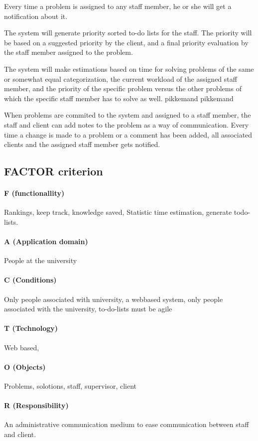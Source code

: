 Every time a problem is assigned to any staff member, he or she will get a notification about it.

The system will generate priority sorted to-do lists for the staff. The priority will be based on a suggested priority by the client, and a final priority evaluation by the staff member assigned to the problem.

The system will make estimations based on time for solving problems of the same or somewhat equal categorization, the current workload of the assigned staff member, and the priority of the specific problem versus the other problems of which the specific staff member has to solve as well. pikkemand pikkemand

When problems are commited to the system and assigned to a staff member, the staff and client can add notes to the problem as a way of communication. Every time a change is made to a problem or a comment has been added, all associated clients and the assigned staff member gets notified.

\subsection{FACTOR criterion}
\label{sec:factor}


\paragraph{F (functionallity)} Rankings, keep track, knowledge saved, Statistic time estimation, generate todo-lists.

\paragraph{A (Application domain)} People at the university

\paragraph{C (Conditions)} Only people associated with university, a webbased system, only people associated with the university, to-do-lists must be agile

\paragraph{T (Technology)} Web based, 

\paragraph{O (Objects)} Problems, solotions, staff, supervisor, client

\paragraph{R (Responsibility)} An administrative communication medium to ease communication between staff and client.\\